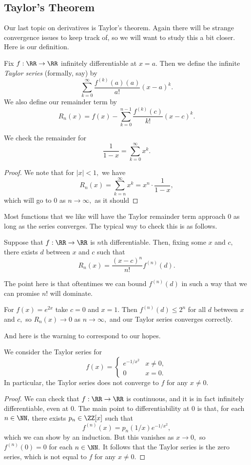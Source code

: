 \documentclass[../notes.tex]{subfiles}
\begin{document}
\subsection{Taylor's Theorem}
Our last topic on derivatives is Taylor's theorem. Again there will be strange convergence issues to keep track of, so we will want to study this a bit closer. Here is our definition.
\begin{defi}
	Fix $f:\RR\to\RR$ infinitely differentiable at $x=a.$ Then we define the infinite \textit{Taylor series} (formally, say) by
	\[\sum_{k=0}^\infty\frac{f^{(k)}(a)(a)}{a!}(x-a)^k.\]
	We also define our remainder term by
	\[R_n(x)=f(x)-\sum_{k=0}^{n-1}\frac{f^{(k)}(c)}{k!}(x-c)^k.\]
\end{defi}
\begin{exe}
	We check the remainder for
	\[\frac1{1-x}=\sum_{k=0}^\infty x^k.\]
\end{exe}
\begin{proof}
	We note that for $|x|<1,$ we have
	\[R_n(x)=\sum_{k=n}^\infty x^k=x^n\cdot\frac1{1-x},\]
	which will go to $0$ as $n\to\infty,$ as it should
\end{proof}
Most functions that we like will have the Taylor remainder term approach $0$ as long as the series converges. The typical way to check this is as follows.
\begin{proposition}
	Suppose that $f:\RR\to\RR$ is $n$th differentiable. Then, fixing some $x$ and $c,$ there exists $d$ between $x$ and $c$ such that
	\[R_n(x)=\frac{(x-c)^n}{n!}f^{(n)}(d).\]
\end{proposition}
The point here is that oftentimes we can bound $f^{(n)}(d)$ in such a way that we can promise $n!$ will dominate.
\begin{example}
	For $f(x)=e^{2x}$ take $c=0$ and $x=1.$ Then $f^{(n)}(d)\le2^n$ for all $d$ between $x$ and $c,$ so $R_n(x)\to0$ as $n\to\infty,$ and our Taylor series converges correctly.
\end{example}
And here is the warning to correspond to our hopes.
\begin{exe}
	We consider the Taylor series for
	\[f(x)=\begin{cases}
		e^{-1/x^2} & x\ne0, \\
		0 & x=0.
	\end{cases}\]
	In particular, the Taylor series does not converge to $f$ for any $x\ne0.$
\end{exe}
\begin{proof}
	We can check that $f:\RR\to\RR$ is continuous, and it is in fact infinitely differentiable, even at $0.$ The main point to differentiability at $0$ is that, for each $n\in\NN,$ there exists $p_n\in\ZZ[x]$ such that
	\[f^{(n)}(x)=p_n(1/x)e^{-1/x^2},\]
	which we can show by an induction. But this vanishes as $x\to0,$ so $f^{(n)}(0)=0$ for each $n\in\NN.$ It follows that the Taylor series is the zero series, which is not equal to $f$ for any $x\ne0.$
\end{proof}
\end{document}
